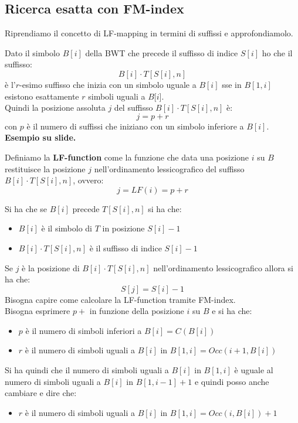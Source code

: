 \documentclass[a4paper,12pt, oneside]{book}
\begin{document}
\subsection{Ricerca esatta con FM-index}
Riprendiamo il concetto di LF-mapping in termini di suffissi e approfondiamolo.
\begin{definizione}
  Dato il simbolo $B[i]$ della BWT che precede il suffisso di indice $S[i]$ ho
  che il suffisso:
  \[B[i]\cdot T[S[i],n]\]
  è l'$r$-esimo suffisso che inizia con un simbolo uguale a $B[i]$ sse in
  $B[1,i]$ esistono esattamente $r$ simboli uguali a $B[i$].\\
  Quindi la posizione assoluta $j$ del suffisso $B[i]\cdot T[S[i],n]$ è:
  \[j=p+r\]
  con $p$ è il numero di suffissi che iniziano con un simbolo inferiore a
  $B[i]$. \\
  \textbf{Esempio su slide.}\\
\end{definizione}
\begin{definizione}
  Definiamo la \textbf{LF-function} come la funzione che data una posizione $i$
  su $B$ restituisce la posizione $j$ nell'ordinamento lessicografico del
  suffisso $B[i]\cdot T[S[i],n]$, ovvero:
  \[j=LF(i)=p+r\]
\end{definizione}
Si ha che se $B[i]$ precede $T[S[i],n]$ si ha che:
\begin{itemize}
  \item $B[i]$ è il simbolo di $T$ in posizione $S[i]-1$
  \item $B[i]\cdot T[S[i],n]$ è il suffisso di indice $S[i]-1$
\end{itemize}
Se $j$ è la posizione di $B[i]\cdot T[S[i],n]$ nell'ordinamento lessicografico
allora si ha che:
\[S[j]=S[i]-1\]
Bisogna capire come calcolare la LF-function tramite FM-index.\\
Bisogna esprimere $p+$ in funzione della posizione $i$ su $B$ e si ha che:
\begin{itemize}
  \item $p$ è il numero di simboli inferiori a $B[i]=C(B[i])$
  \item $r$ è il numero di simboli uguali a $B[i]$ in $B[1,i]=Occ(i+1,B[i])$
\end{itemize}
Si ha quindi che il numero di simboli uguali a $B[i]$ in $B[1,i]$ è uguale al
numero di simboli uguali a $B[i]$ in $B[1,i-1]+1$ e quindi posso anche cambiare
e dire che:
\begin{itemize}
  \item $r$ è il numero di simboli uguali a $B[i]$ in $B[1,i]=Occ(i,B[i])+1$
\end{itemize}
\end{document}
